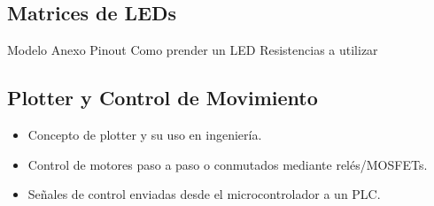 \subsection{Matrices de LEDs}
Modelo
Anexo Pinout
Como prender un LED
Resistencias a utilizar



\subsection{Plotter y Control de Movimiento}
\begin{itemize}
    \item Concepto de plotter y su uso en ingeniería.
    \item Control de motores paso a paso o conmutados mediante relés/MOSFETs.
    \item Señales de control enviadas desde el microcontrolador a un PLC.
\end{itemize}
